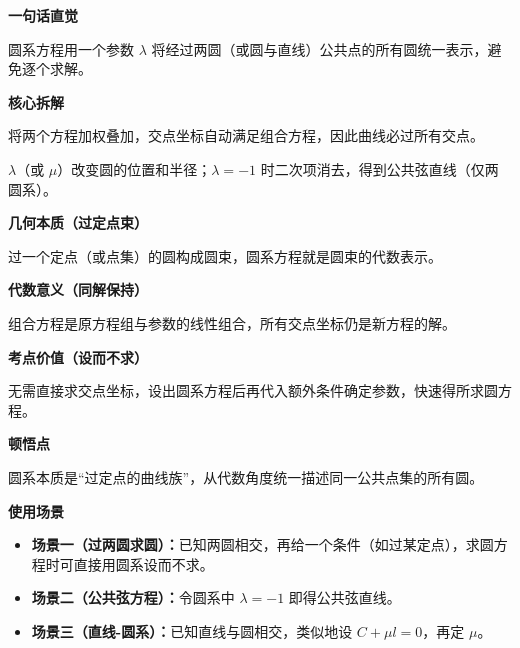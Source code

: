 \begin{explanationbox}

	\textbf{\textcolor{CExplanation}{一句话直觉}}

	圆系方程用一个参数 $\lambda$ 将经过两圆（或圆与直线）公共点的所有圆统一表示，避免逐个求解。

	\medskip
	\textbf{\textcolor{CExplanation}{核心拆解}}
	\begin{description}[style=nextline, leftmargin=2.8em, labelsep=0.5em, itemsep=0.45em]
		\item[\textbf{要点一（线性组合）：}] 将两个方程加权叠加，交点坐标自动满足组合方程，因此曲线必过所有交点。
		\item[\textbf{要点二（参数调节）：}] $\lambda$（或 $\mu$）改变圆的位置和半径；$\lambda=-1$ 时二次项消去，得到公共弦直线（仅两圆系）。
	\end{description}

	\medskip
	\textbf{\textcolor{CExplanation}{几何本质（过定点束）}}

	过一个定点（或点集）的圆构成圆束，圆系方程就是圆束的代数表示。

	\medskip
	\textbf{\textcolor{CExplanation}{代数意义（同解保持）}}

	组合方程是原方程组与参数的线性组合，所有交点坐标仍是新方程的解。

	\medskip
	\textbf{\textcolor{CExplanation}{考点价值（设而不求）}}

	无需直接求交点坐标，设出圆系方程后再代入额外条件确定参数，快速得所求圆方程。

	\medskip
	\textbf{\textcolor{CExplanation}{顿悟点}}

	圆系本质是“过定点的曲线族”，从代数角度统一描述同一公共点集的所有圆。

	\medskip
	\textbf{\textcolor{CExplanation}{使用场景}}
	\begin{itemize}[leftmargin=*, itemsep=0.5em, topsep=0.4em]
		\item \textbf{场景一（过两圆求圆）：}已知两圆相交，再给一个条件（如过某定点），求圆方程时可直接用圆系设而不求。
		\item \textbf{场景二（公共弦方程）：}令圆系中 $\lambda=-1$ 即得公共弦直线。
		\item \textbf{场景三（直线-圆系）：}已知直线与圆相交，类似地设 $C+\mu l=0$，再定 $\mu$。
	\end{itemize}
\end{explanationbox}
